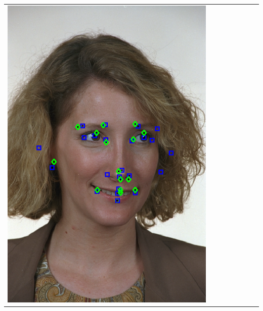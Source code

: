 \documentclass[landscape,final,a0paper,fontscale=0.27065]{baposter}
\begin{document}
\begin{poster}
{{\begin{tabular}{@{}rccccccc@{}}
 \parbox[c]{0.11\linewidth}{\includegraphics[width=\linewidth]{images/l_qr_success_2.pdf}} &

\end{tabular}}}
\end{poster}
\end{document}
